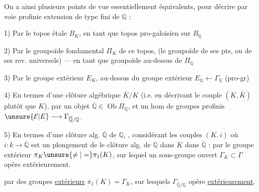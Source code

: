 On a ainsi plusieurs points de vue essentiellement équivalents, pour décrire par voie profinie  extension  de type fini de $\mathbb Q$ :

1) Par le topos étale $B_K$, en tant que topos pro-galoisien sur $B_{\mathbb Q}$

2) Par le groupoïde fondamental $\Pi_K$ de ce topos, (le groupoïde de ses pts, ou de ses rev. universels) --- en tant que groupoïde au-dessus de $\Pi_{\mathbb Q}$

 3) Par le groupe extérieur $E_K$, au-dessus du groupe extérieur $E_{\mathbb Q}\longleftarrow\Gamma_{\mathbb Q}$ (pro-gr)

4) En termes d'une clôture algébrique $\bar K/K$ (i.e. en décrivant le couple $(K,\bar K)$ plutôt que $K$), par un objet $\overline{\mathbb Q}\in\operatorname{Ob}\Pi_{\mathbb Q}$, et un hom de groupes profinis $\unsure{\mathcal E|E}\longrightarrow\Gamma_{\overline{\mathbb Q}/\mathbb Q}$.

5) En termes d'une clôture alg.  $\overline{\mathbb Q}$ de $\mathbb Q$, ,  considérant les couples $(K,i)$ où $i:k\longrightarrow\overline{\mathbb Q}$ est un plongement de le clôture alg. de $\mathbb Q$ dans $K$ dans $\overline{\mathbb Q}$ :  par le groupe extérieur $\pi_K\unsure{\neq|=}\pi_1(K)$, sur lequel un sous-groupe ouvert $\Gamma_K\subset\Gamma$ opère extérieurement.


par des groupes  \uline{extérieurs} $\pi_1(K)=\Gamma_K$, sur lesquels  $\Gamma_{\overline{\mathbb Q}/\mathbb Q}$ opère \uline{extérieurement}.

